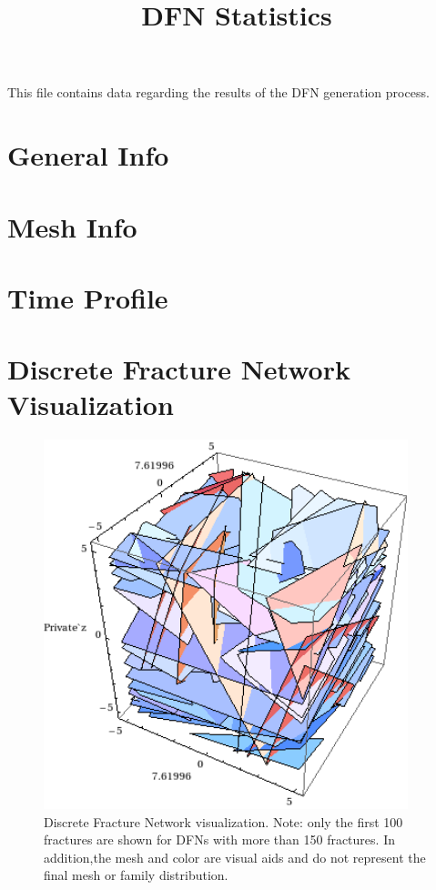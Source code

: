 \documentclass[a4paper,11pt]{article}
\title{DFN Statistics}
\begin{document}
\maketitle 
This file contains data regarding the results of the DFN generation process.

\begingroup
\def\addvspace#1{}
\tableofcontents
\endgroup

\section{General Info}


\section{Mesh Info}


\section{Time Profile}


\section{Discrete Fracture Network Visualization}
\begin{figure}[H]
  \centering
  \includegraphics[width=300pt]{dfn.png}
  \caption[Discrete fracture network visualization]{Discrete Fracture Network visualization. Note: only the first 100 fractures are shown for DFNs with more than 150 fractures. In addition,the mesh and color are visual aids and do not represent the final mesh or family distribution.}
\end{figure}
\end{document}
